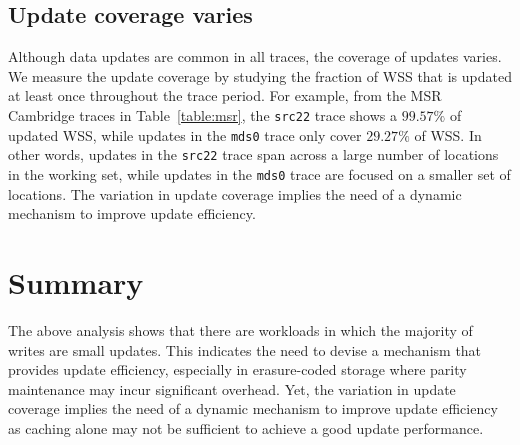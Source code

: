 \subsection{Update coverage varies} Although data updates are common in all
traces, the coverage of updates varies. %
We measure the update coverage by studying the fraction of WSS that is updated
at least once throughout the trace period. For example, from the MSR Cambridge
traces in Table~\ref{table:msr}, the \texttt{src22} trace shows a $99.57\%$ of
updated WSS, while updates in the \texttt{mds0} trace only cover $29.27\%$ of
WSS. In other words, updates in the \texttt{src22} trace span across a large
number of locations in the working set, while updates in the \texttt{mds0}
trace are focused on a smaller set of locations.  The variation in update
coverage implies the need of a dynamic mechanism to improve update efficiency.


\section{Summary} 

The above analysis shows that there are workloads in which the majority of
writes are small updates. This indicates the need to devise a mechanism that
provides update efficiency, especially in erasure-coded storage where parity
maintenance may incur significant overhead. Yet, the variation in update
coverage implies the need of a dynamic mechanism to improve update efficiency as
caching alone may not be sufficient to achieve a good update performance. 
